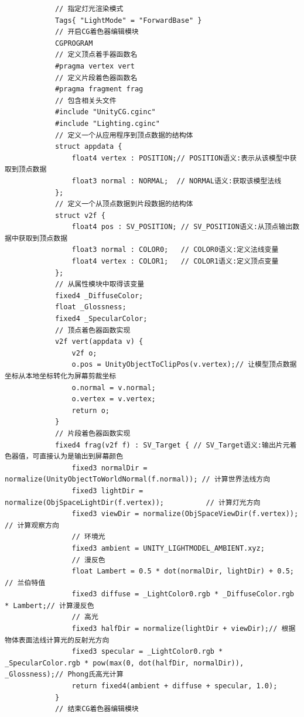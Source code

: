 \documentclass[9pt, b5paper]{article}
\begin{document}
\begin{itemize}
\begin{verbatim}
            // 指定灯光渲染模式  
            Tags{ "LightMode" = "ForwardBase" }  
            // 开启CG着色器编辑模块  
            CGPROGRAM  
            // 定义顶点着手器函数名  
            #pragma vertex vert  
            // 定义片段着色器函数名  
            #pragma fragment frag  
            // 包含相关头文件  
            #include "UnityCG.cginc"      
            #include "Lighting.cginc"  
            // 定义一个从应用程序到顶点数据的结构体  
            struct appdata {  
                float4 vertex : POSITION;// POSITION语义:表示从该模型中获取到顶点数据  
                float3 normal : NORMAL;  // NORMAL语义:获取该模型法线  
            };  
            // 定义一个从顶点数据到片段数据的结构体  
            struct v2f {  
                float4 pos : SV_POSITION; // SV_POSITION语义:从顶点输出数据中获取到顶点数据  
                float3 normal : COLOR0;   // COLOR0语义:定义法线变量  
                float4 vertex : COLOR1;   // COLOR1语义:定义顶点变量  
            };  
            // 从属性模块中取得该变量  
            fixed4 _DiffuseColor;  
            float _Glossness;  
            fixed4 _SpecularColor;  
            // 顶点着色器函数实现  
            v2f vert(appdata v) {  
                v2f o;  
                o.pos = UnityObjectToClipPos(v.vertex);// 让模型顶点数据坐标从本地坐标转化为屏幕剪裁坐标  
                o.normal = v.normal;  
                o.vertex = v.vertex;  
                return o;  
            }  
            // 片段着色器函数实现  
            fixed4 frag(v2f f) : SV_Target { // SV_Target语义:输出片元着色器值，可直接认为是输出到屏幕颜色   
                fixed3 normalDir = normalize(UnityObjectToWorldNormal(f.normal)); // 计算世界法线方向  
                fixed3 lightDir = normalize(ObjSpaceLightDir(f.vertex));          // 计算灯光方向  
                fixed3 viewDir = normalize(ObjSpaceViewDir(f.vertex));            // 计算观察方向  
                // 环境光  
                fixed3 ambient = UNITY_LIGHTMODEL_AMBIENT.xyz;  
                // 漫反色  
                float Lambert = 0.5 * dot(normalDir, lightDir) + 0.5;           // 兰伯特值  
                fixed3 diffuse = _LightColor0.rgb * _DiffuseColor.rgb * Lambert;// 计算漫反色  
                // 高光  
                fixed3 halfDir = normalize(lightDir + viewDir);// 根据物体表面法线计算光的反射光方向  
                fixed3 specular = _LightColor0.rgb * _SpecularColor.rgb * pow(max(0, dot(halfDir, normalDir)), _Glossness);// Phong氏高光计算  
                return fixed4(ambient + diffuse + specular, 1.0);  
            }  
            // 结束CG着色器编辑模块  

\end{verbatim}
\end{itemize}
\end{document}
